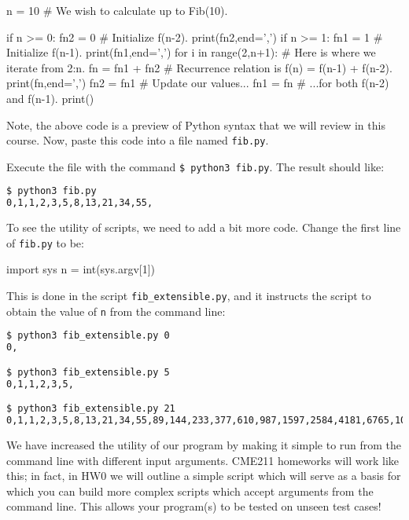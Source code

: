 \documentclass[12pt,letterpaper,twoside]{article}
\begin{document}
\begin{python}
n = 10                  # We wish to calculate up to Fib(10).

if n >= 0:
    fn2 = 0             # Initialize f(n-2).
    print(fn2,end=',')
if n >= 1:
    fn1 = 1             # Initialize f(n-1).
    print(fn1,end=',')
for i in range(2,n+1):  # Here is where we iterate from 2:n.
    fn = fn1 + fn2      # Recurrence relation is f(n) = f(n-1) + f(n-2).
    print(fn,end=',')
    fn2 = fn1           # Update our values...
    fn1 = fn            # ...for both f(n-2) and f(n-1).
print()
\end{python}

Note, the above code is a preview of Python syntax that we will review
in this course. Now, paste this code into a file named \texttt{fib.py}.

Execute the file with the command \newline 
\texttt{\$\ python3\ fib.py}. The result should like:

\begin{lstlisting}[language=bash]
$ python3 fib.py
0,1,1,2,3,5,8,13,21,34,55,
\end{lstlisting}

To see the utility of scripts, we need to add a bit more code. Change
the first line of \texttt{fib.py} to be:

\begin{python}
import sys
n = int(sys.argv[1])
\end{python}

This is done in the script \texttt{fib\_extensible.py}, and it instructs the script to obtain the value of \texttt{n} from the command line:

\begin{lstlisting}[language=bash]
$ python3 fib_extensible.py 0
0,

$ python3 fib_extensible.py 5
0,1,1,2,3,5,

$ python3 fib_extensible.py 21
0,1,1,2,3,5,8,13,21,34,55,89,144,233,377,610,987,1597,2584,4181,6765,10946,
\end{lstlisting}

We have increased the utility of our program by making it simple to run
from the command line with different input arguments. CME211 homeworks
will work like this; in fact, in HW0 we will outline a simple script which will serve as a basis for which you can build more complex scripts which accept arguments from the command line. This allows your program(s) to be tested on unseen test cases!
\end{document}
